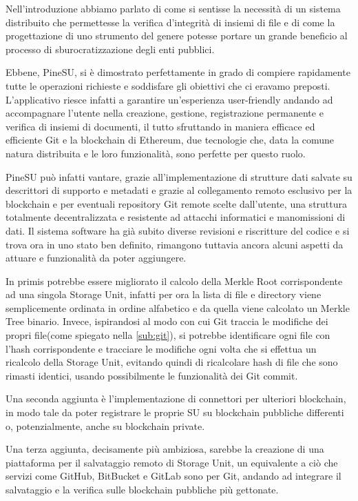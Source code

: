 \label{cap:sf}
Nell'introduzione abbiamo parlato di come si sentisse la necessità
di un sistema distribuito che permettesse la verifica d'integrità
di insiemi di file e di come la progettazione di uno strumento del
genere potesse portare un grande beneficio al processo di
sburocratizzazione degli enti pubblici.

Ebbene, PineSU, si è dimostrato perfettamente in grado di
compiere rapidamente tutte le operazioni richieste e soddisfare gli
obiettivi che ci eravamo preposti.
L'applicativo riesce infatti a garantire un'esperienza user-friendly andando ad 
accompagnare l'utente nella 
creazione, gestione, registrazione permanente e verifica di insiemi di documenti,
il tutto sfruttando in maniera efficace ed efficiente Git e la blockchain di Ethereum,
due tecnologie che, data la comune natura distribuita e le loro funzionalità,
sono perfette per questo ruolo.

PineSU può infatti vantare, grazie all'implementazione di strutture dati salvate
su descrittori di supporto e metadati e grazie al collegamento remoto esclusivo per la blockchain
e per eventuali repository Git remote scelte dall'utente, una struttura totalmente
decentralizzata e resistente ad attacchi informatici e manomissioni di dati.
Il sistema software ha già subito diverse revisioni e riscritture del codice e si trova ora in uno
stato ben definito, rimangono tuttavia ancora alcuni aspetti da attuare e funzionalità da poter aggiungere.

In primis potrebbe essere migliorato il calcolo della Merkle Root corrispondente
ad una singola Storage Unit, infatti per ora la lista di file e directory viene
semplicemente ordinata in ordine alfabetico e da quella viene calcolato
un Merkle Tree binario. Invece, ispirandosi al modo con cui Git traccia le modifiche
dei propri file(come spiegato nella \autoref{sub:git}),
si potrebbe identificare ogni file con l'hash corrispondente e tracciare le modifiche ogni
volta che si effettua un ricalcolo della Storage Unit, evitando quindi di ricalcolare hash
di file che sono rimasti identici, usando possibilmente le funzionalità dei Git commit.

Una seconda aggiunta è l'implementazione di connettori per ulteriori blockchain, in modo tale
da poter registrare le proprie SU su blockchain pubbliche differenti o, potenzialmente,
anche su blockchain private.

Una terza aggiunta, decisamente più ambiziosa, sarebbe la creazione di una piattaforma
per il salvataggio remoto di Storage Unit, un equivalente a ciò che servizi come GitHub,
BitBucket e GitLab sono per Git, andando ad integrare il salvataggio e la verifica sulle
blockchain pubbliche più gettonate.
